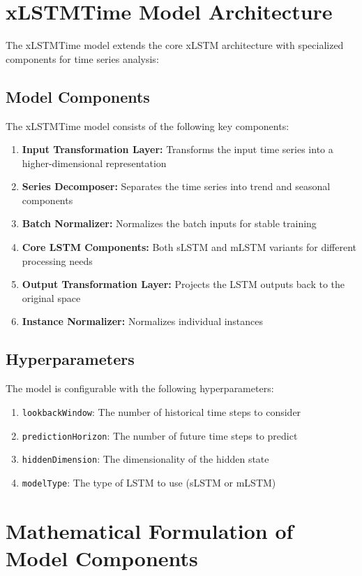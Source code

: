 \documentclass[11pt,a4paper]{article}
\begin{document}
\section{xLSTMTime Model Architecture}

The xLSTMTime model extends the core xLSTM architecture with specialized components for time series analysis:

\subsection{Model Components}

The xLSTMTime model consists of the following key components:
\begin{enumerate}
    \item \textbf{Input Transformation Layer:} Transforms the input time series into a higher-dimensional representation
    \item \textbf{Series Decomposer:} Separates the time series into trend and seasonal components
    \item \textbf{Batch Normalizer:} Normalizes the batch inputs for stable training
    \item \textbf{Core LSTM Components:} Both sLSTM and mLSTM variants for different processing needs
    \item \textbf{Output Transformation Layer:} Projects the LSTM outputs back to the original space
    \item \textbf{Instance Normalizer:} Normalizes individual instances
\end{enumerate}

\subsection{Hyperparameters}

The model is configurable with the following hyperparameters:
\begin{enumerate}
    \item \texttt{lookbackWindow}: The number of historical time steps to consider
    \item \texttt{predictionHorizon}: The number of future time steps to predict
    \item \texttt{hiddenDimension}: The dimensionality of the hidden state
    \item \texttt{modelType}: The type of LSTM to use (sLSTM or mLSTM)
\end{enumerate}

\section{Mathematical Formulation of Model Components}
\end{document}

